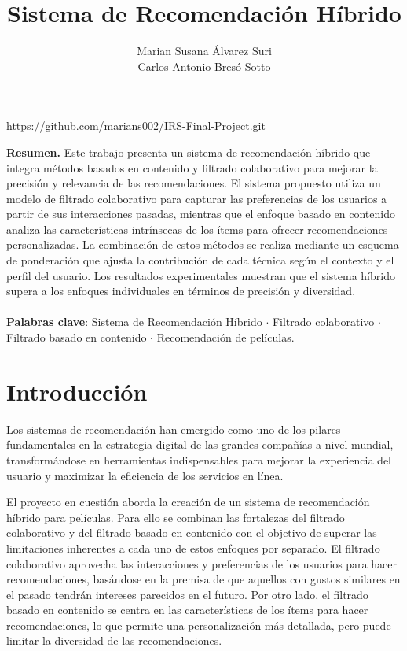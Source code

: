 \documentclass[runningheads]{llncs}
\begin{document}
%
\title{Sistema de Recomendación Híbrido}
%
%
\urldef{\repo}\url{https://github.com/marians002/IRS-Final-Project.git}

\author{Marian Susana Álvarez Suri \\ Carlos Antonio Bresó Sotto \\
 \repo}


%
%
%
\maketitle              
%
\noindent 
\textbf{Resumen.}
Este trabajo presenta un sistema de recomendación híbrido que integra métodos basados en contenido y filtrado colaborativo para mejorar la precisión y relevancia de las recomendaciones. El sistema propuesto utiliza un modelo de filtrado colaborativo para capturar las preferencias de los usuarios a partir de sus interacciones pasadas, mientras que el enfoque basado en contenido analiza las características intrínsecas de los ítems para ofrecer recomendaciones personalizadas. La combinación de estos métodos se realiza mediante un esquema de ponderación que ajusta la contribución de cada técnica según el contexto y el perfil del usuario. Los resultados experimentales muestran que el sistema híbrido supera a los enfoques individuales en términos de precisión y diversidad.
\\
\\
\textbf{Palabras clave}: Sistema de Recomendación Híbrido $ \cdot $  Filtrado colaborativo $ \cdot $ Filtrado basado en contenido $ \cdot $ Recomendación de películas.

%
%
% 
\section{Introducción}

Los sistemas de recomendación han emergido como uno de los pilares fundamentales en la estrategia digital de las grandes compañías a nivel mundial, transformándose en herramientas indispensables para mejorar la experiencia del usuario y maximizar la eficiencia de los servicios en línea.

El proyecto en cuestión aborda la creación de un sistema de recomendación híbrido para películas. Para ello se combinan las fortalezas del filtrado colaborativo y del filtrado basado en contenido con el objetivo de superar las limitaciones inherentes a cada uno de estos enfoques por separado. El filtrado colaborativo aprovecha las interacciones y preferencias de los usuarios para hacer recomendaciones, basándose en la premisa de que aquellos con gustos similares en el pasado tendrán intereses parecidos en el futuro. Por otro lado, el filtrado basado en contenido se centra en las características de los ítems para hacer recomendaciones, lo que permite una personalización más detallada, pero puede limitar la diversidad de las recomendaciones.
\end{document}
